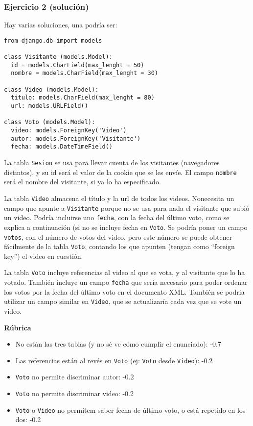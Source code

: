 \subsubsection{Ejercicio 2 (solución)}

Hay varias soluciones, una podría ser:

\begin{verbatim}
from django.db import models

class Visitante (models.Model):
  id = models.CharField(max_lenght = 50)
  nombre = models.CharField(max_lenght = 30)

class Video (models.Model):
  titulo: models.CharField(max_lenght = 80)
  url: models.URLField()

class Voto (models.Model):
  video: models.ForeignKey('Video')
  autor: models.ForeignKey('Visitante')
  fecha: models.DateTimeField()
\end{verbatim}

La tabla \texttt{Sesion} se usa para llevar cuenta de los visitantes (navegadores distintos), y su id será el valor de la cookie que se les envíe. El campo \texttt{nombre} será el nombre del visitante, si ya lo ha especificado.

La tabla \texttt{Video} almacena el título y la url de todos los videos. Nonecesita un campo que apunte a \texttt{Visitante} porque no se usa para nada el visitante que subió un video. Podría incluirse uno \texttt{fecha}, con la fecha del último voto, como se explica a continuación (si no se incluye fecha en \texttt{Voto}. Se podría poner un campo \texttt{votos}, con el número de votos del video, pero este número se puede obtener fácilmente de la tabla \texttt{Voto}, contando los que apunten (tengan como ``foreign key'') el video en cuestión.

La tabla \texttt{Voto} incluye referencias al video al que se vota, y al visitante que lo ha votado. También incluye un campo \texttt{fecha} que sería necesario para poder ordenar los votos por la fecha del último voto en el documento XML. También se podria utilizar un campo similar en \texttt{Video}, que se actualizaría cada vez que se vote un video.

\vspace{.4cm}\textbf{Rúbrica}

\begin{itemize}
\item No están las tres tablas (y no sé ve cómo cumplir el enunciado): -0.7
\item Las referencias están al revés en \texttt{Voto} (ej: \texttt{Voto} desde \texttt{Video}): -0.2
\item \texttt{Voto} no permite discriminar autor: -0.2
\item \texttt{Voto} no permite discriminar video: -0.2
\item \texttt{Voto} o \texttt{Video} no permitem saber fecha de último voto, o está repetido en los dos: -0.2
\end{itemize}

